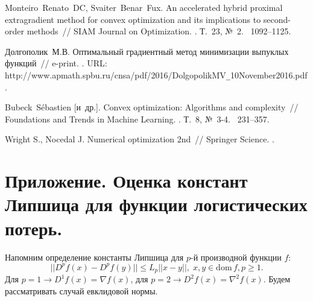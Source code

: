 \documentclass[12pt,twoside]{article}
\begin{document}
\begin{thebibliography}{1}
		Monteiro~Renato~DC, Svaiter~Benar~Fux. An accelerated hybrid proximal
		extragradient method for convex optimization and its implications to
		second-order methods~// SIAM Journal on Optimization.
		.
		\newblock Т.~23, {№}~2.
		~1092--1125.
		
		Долгополик~М.В. Оптимальный градиентный
		метод минимизации выпуклых функций~// e-print.
		. URL:
		http://www.apmath.spbu.ru/cnsa/pdf/2016/DolgopolikMV\verb|_|10November2016.pdf.
		
		Bubeck~S{\'e}bastien {[и~др.]}. Convex optimization: Algorithms and
		complexity~// Foundations and Trends{\textregistered} in Machine Learning.
		.
		\newblock Т.~8, {№}~3-4.
		~231--357.
		
		Wright S., Nocedal J. Numerical optimization 2nd~// 
		\newblock Springer Science. 
		. 
		
	\end{thebibliography}
	
\section{Приложение. Оценка констант Липшица для функции логистических потерь.}
Напомним определение константы Липшица для $p$-й производной функции $f$:
\begin{equation}
||D^p f(x) - D^p f(y)|| \leq L_p||x - y||, \; x,y \in \mathrm{dom} \, f, p \geq 1.
\end{equation}
Для $p = 1 \to D^1 f(x) = \nabla f(x)$, для $p = 2 \to D^2 f(x) = \nabla^2 f(x)$.
Будем рассматривать случай евклидовой нормы. 
\end{document}
